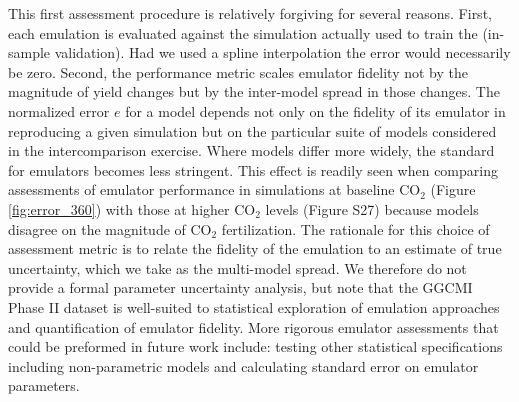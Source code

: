 \documentclass[gmd, manuscript]{copernicus} %
\begin{document}
This first assessment procedure is relatively forgiving for several reasons. 
First, each emulation is evaluated against the simulation actually used to train the  (in-sample validation). 
Had we used a spline interpolation the error would necessarily be zero. 
Second, the performance metric scales emulator fidelity not by the magnitude of yield changes but by the inter-model spread in those changes. 
The normalized error $e$ for a model depends not only on the fidelity of its emulator in reproducing a given simulation but on the particular suite of models considered in the intercomparison exercise. 
Where models differ more widely, the standard for emulators becomes less stringent. 
This effect is readily seen when comparing assessments of emulator performance in simulations at baseline CO$_2$ (Figure \ref{fig:error_360}) with those at higher CO$_2$ levels (Figure S27) because models disagree on the magnitude of CO$_2$ fertilization. 
The rationale for this choice of assessment metric is to relate the fidelity of the emulation to an estimate of true uncertainty, which we take as the multi-model spread. 
We therefore do not provide a formal parameter uncertainty analysis, but note that the GGCMI Phase II dataset is well-suited to statistical exploration of emulation approaches and quantification of emulator fidelity. 
More rigorous emulator assessments that could be preformed in future work include: testing other statistical specifications including non-parametric models and calculating standard error on emulator parameters.
\end{document}
